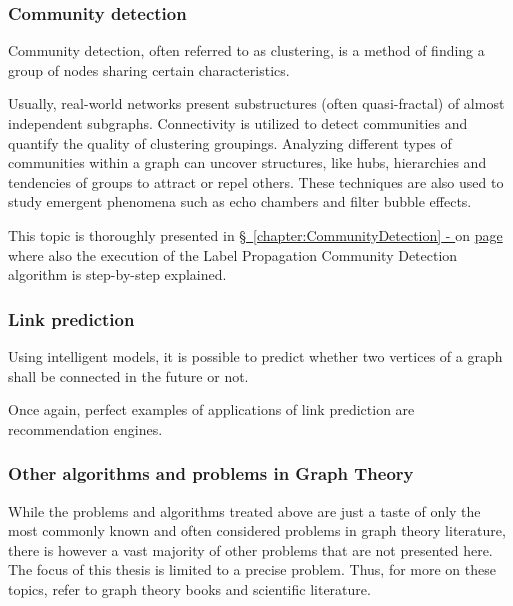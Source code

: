 \subsubsection{Community detection} \label{subsubsection:LiteratureReview/ShortreviewofGraphTheoryconcepts/Graphanalysisandalgorithms/Communitydetection}
Community detection, often referred to as clustering, is a method of finding a group of nodes sharing certain characteristics.

Usually, real-world networks present substructures (often quasi-fractal) of almost independent subgraphs.
Connectivity is utilized to detect communities and quantify the quality of clustering groupings.
Analyzing different types of communities within a graph can uncover structures, like hubs, hierarchies and tendencies of groups to attract or repel others.
These techniques are also used to study emergent phenomena such as echo chambers and filter bubble effects.

This topic is thoroughly presented in \hyperref[chapter:CommunityDetection]{\S\ \ref{chapter:CommunityDetection} - } on \hyperref[chapter:CommunityDetection]{page \pageref{chapter:CommunityDetection}} where also the execution of the Label Propagation Community Detection algorithm is step-by-step explained.

\subsubsection{Link prediction} \label{subsubsection:LiteratureReview/ShortreviewofGraphTheoryconcepts/Graphanalysisandalgorithms/Linkprediction}
Using intelligent models, it is possible to predict whether two vertices of a graph shall be connected in the future or not.

Once again, perfect examples of applications of link prediction are recommendation engines.

\subsubsection{Other algorithms and problems in Graph Theory} \label{subsection:LiteratureReview/ShortreviewofGraphTheoryconcepts/Graphanalysisandalgorithms/OtheralgorithmsandproblemsinGraphTheory}
While the problems and algorithms treated above are just a taste of only the most commonly known and often considered problems in graph theory literature, there is however a vast majority of other problems that are not presented here.
The focus of this thesis is limited to a precise problem.
Thus, for more on these topics, refer to graph theory books and scientific literature.

